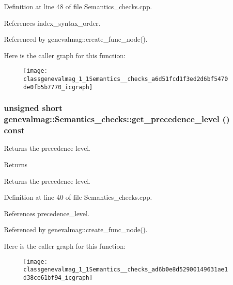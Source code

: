 Definition at line 48 of file Semantics\_\-checks.cpp.



References index\_\-syntax\_\-order.



Referenced by genevalmag::create\_\-func\_\-node().



Here is the caller graph for this function:\nopagebreak
\begin{figure}[H]
\begin{center}
\leavevmode
\texttt{[image: classgenevalmag\_1\_1Semantics\_\_checks\_a6d51fcd1f3ed2d6bf5470de0fb5b7770\_icgraph]}
\end{center}
\end{figure}


\hypertarget{classgenevalmag_1_1Semantics__checks_ad6b0e8d52900149631ae1d38ce61bf94}{
\subsubsection[{get\_\-precedence\_\-level}]{\setlength{\rightskip}{0pt plus 5cm}unsigned short genevalmag::Semantics\_\-checks::get\_\-precedence\_\-level () const}}
\label{classgenevalmag_1_1Semantics__checks_ad6b0e8d52900149631ae1d38ce61bf94}
Returns the precedence level. \begin{DoxyReturn}{Returns}

\end{DoxyReturn}
Returns the precedence level. 

Definition at line 40 of file Semantics\_\-checks.cpp.



References precedence\_\-level.



Referenced by genevalmag::create\_\-func\_\-node().



Here is the caller graph for this function:\nopagebreak
\begin{figure}[H]
\begin{center}
\leavevmode
\texttt{[image: classgenevalmag\_1\_1Semantics\_\_checks\_ad6b0e8d52900149631ae1d38ce61bf94\_icgraph]}
\end{center}
\end{figure}


